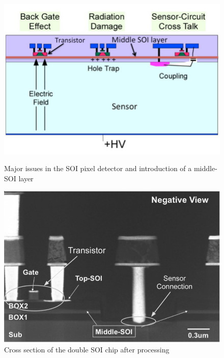\begin{figure}
	\begin{minipage}{0.49\textwidth}
		\centering     
		\includegraphics*[width=\textwidth,keepaspectratio]{VertexDetector/SOI/SOI_Schematic}
		\caption{Major issues in the SOI pixel detector and introduction of a middle-SOI layer}
		\label{fig:VertexDetector:SOI:SOI_Schematic}
 	\end{minipage}
 	\hfill
 	\begin{minipage}{0.49\textwidth}
 		\centering
    	\includegraphics*[width=\textwidth,keepaspectratio]{VertexDetector/SOI/crossSectionAfterProcessing}
		\caption{Cross section of the double SOI chip after processing}
		\label{fig:VertexDetector:SOI:crossSectionAfterProcessing}
 	\end{minipage}
 \end{figure}

